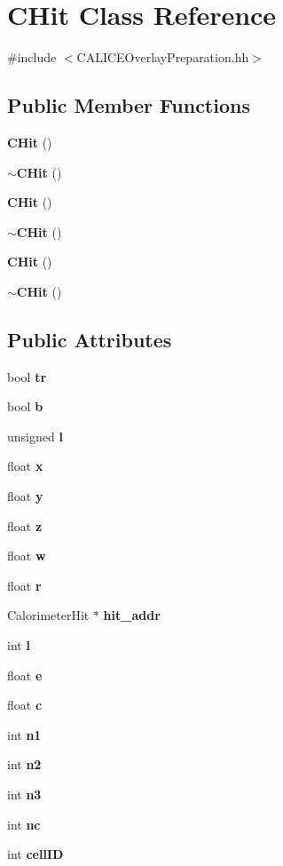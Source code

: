 \section{C\-Hit Class Reference}
\label{classCHit}


{\ttfamily \#include $<$C\-A\-L\-I\-C\-E\-Overlay\-Preparation.\-hh$>$}

\subsection*{Public Member Functions}
\begin{DoxyCompactItemize}
\item 
{\bf C\-Hit} ()
\item 
{\bf $\sim$\-C\-Hit} ()
\item 
{\bf C\-Hit} ()
\item 
{\bf $\sim$\-C\-Hit} ()
\item 
{\bf C\-Hit} ()
\item 
{\bf $\sim$\-C\-Hit} ()
\end{DoxyCompactItemize}
\subsection*{Public Attributes}
\begin{DoxyCompactItemize}
\item 
bool {\bfseries tr}\label{classCHit_a7d49db2e8e443fb2d4dd8367bb7b113a}

\item 
bool {\bf b}
\item 
unsigned {\bf l}
\item 
float {\bf x}
\item 
float {\bf y}
\item 
float {\bf z}
\item 
float {\bf w}
\item 
float {\bf r}
\item 
Calorimeter\-Hit $\ast$ {\bf hit\-\_\-addr}
\item 
int {\bfseries l}\label{classCHit_a4938dfeea38c213d593cfb06e832d2d8}

\item 
float {\bf e}
\item 
float {\bf c}
\item 
int {\bf n1}
\item 
int {\bf n2}
\item 
int {\bf n3}
\item 
int {\bf nc}
\item 
int {\bf cell\-I\-D}
\end{DoxyCompactItemize}


